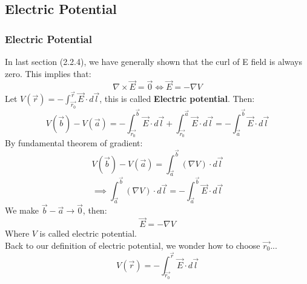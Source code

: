 \documentclass[12pt,a4paper,twoside]{article}
\numberwithin{equation}{section}
\begin{document}
\subsection{Electric Potential}
\subsubsection{Electric Potential}
    In last section (2.2.4), we have generally shown that the curl of E field is always zero. This implies that:
    \[\nabla\times \overrightarrow{E}=\overrightarrow{0}\iff \overrightarrow{E}=-\nabla V\]
    Let $V(\overrightarrow{r})=-\int_{\overrightarrow{r_0}}^{\overrightarrow{r}}\overrightarrow{E}\cdot d\overrightarrow{l}$, this is called \textbf{Electric potential}. Then:
    \[V(\overrightarrow{b})-V(\overrightarrow{a})=-\int_{\overrightarrow{r_0}}^{\overrightarrow{b}}\overrightarrow{E}\cdot d\overrightarrow{l}+\int_{\overrightarrow{r_0}}^{\overrightarrow{a}}\overrightarrow{E}\cdot d\overrightarrow{l}=-\int_{\overrightarrow{a}}^{\overrightarrow{b}}\overrightarrow{E}\cdot d \overrightarrow{l}\]
    By fundamental theorem of gradient:
    \[V(\overrightarrow{b})-V(\overrightarrow{a})=\int_{\overrightarrow{a}}^{\overrightarrow{b}}(\nabla V)\cdot d\overrightarrow{l}\]
    \[\implies \int_{\overrightarrow{a}}^{\overrightarrow{b}}(\nabla V)\cdot d\overrightarrow{l}=-\int_{\overrightarrow{a}}^{\overrightarrow{b}}\overrightarrow{E}\cdot d \overrightarrow{l}\]
    We make $\overrightarrow{b}-\overrightarrow{a}\to \overrightarrow{0}$, then:
        \begin{equation}
            \overrightarrow{E}=-\nabla V
            \label{eq: E-V equation}
        \end{equation}
    Where $V$ is called electric potential.\\
    \newline
    \noindent Back to our definition of electric potential, we wonder how to choose $\overrightarrow{r_0}$...
    \begin{equation}
        V(\overrightarrow{r})=-\int_{\overrightarrow{r_0}}^{\overrightarrow{r}}\overrightarrow{E}\cdot d\overrightarrow{l}
        \label{eq:potential}
    \end{equation}
\end{document}

